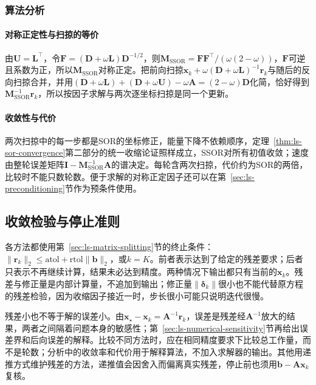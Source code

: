 \subsubsection{算法分析}

\paragraph{对称正定性与扫掠的等价}
由$\bm U=\bm L^\top$，令$\bm F=(\bm D+\omega\bm L)\bm D^{-1/2}$，则$\bm M_{\mathrm{SSOR}}=\bm F\bm F^\top/(\omega(2-\omega))$，$\bm F$可逆且系数为正，所以$\bm M_{\mathrm{SSOR}}$对称正定。把前向扫掠$\bm x_k+\omega(\bm D+\omega\bm L)^{-1}\bm r_k$与随后的反向扫掠合并，并用$(\bm D+\omega\bm L)+(\bm D+\omega\bm U)-\omega\bm A=(2-\omega)\bm D$化简，恰好得到$\bm M_{\mathrm{SSOR}}^{-1}\bm r_k$，所以按因子求解与两次逐坐标扫掠是同一个更新。

\paragraph{收敛性与代价}
两次扫掠中的每一步都是SOR的坐标修正，能量下降不依赖顺序，定理~\ref{thm:ls-sor-convergence}第二部分的统一收缩论证照样成立，SSOR对所有初值收敛；速度由整轮误差矩阵$\bm I-\bm M_{\mathrm{SSOR}}^{-1}\bm A$的谱决定。每轮含两次扫掠，代价约为SOR的两倍，比较时不能只数轮数。便于求解的对称正定因子还可以在第~\ref{sec:ls-preconditioning}节作为预条件使用。

\subsection{收敛检验与停止准则}
\label{sec:ls-stationary-stopping}

各方法都使用第~\ref{sec:ls-matrix-splitting}节的终止条件：$\lVert\bm r_k\rVert_2\leq\mathrm{atol}+\mathrm{rtol}\lVert\bm b\rVert_2$，或$k=K$。前者表示达到了给定的残差要求；后者只表示不再继续计算，结果未必达到精度。两种情况下输出都只有当前的$\bm x_k$。残差与修正量是内部计算量，不追加到输出；修正量$\lVert\bm\delta_k\rVert$很小也不能代替原方程的残差检验，因为收缩因子接近一时，步长很小可能只说明迭代很慢。

残差小也不等于解的误差小。由$\bm x_\star-\bm x_k=\bm A^{-1}\bm r_k$，误差是残差经$\bm A^{-1}$放大的结果，两者之间隔着问题本身的敏感性；第~\ref{sec:ls-numerical-sensitivity}节再给出误差界和后向误差的解释。比较不同方法时，应在相同精度要求下比较总工作量，而不是轮数；分析中的收敛率和代价用于解释算法，不加入求解器的输出。其他用递推方式维护残差的方法，递推值会因舍入而偏离真实残差，停止前也须用$\bm b-\bm A\bm x_k$复核。
